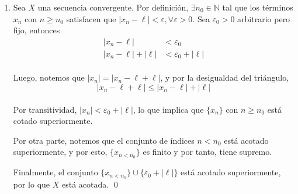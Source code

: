 \documentclass[11pt]{article}
\newcommand{\N}{\mathbb{N}}
\let\epsilon\varepsilon
\begin{document}
\begin{enumerate}[label=\alph*),font=\bfseries]
    \item Sea $X$ una secuencia convergente. Por definición, $\exists n_0 \in \N$ tal que los términos $x_n$ con $n\geq n_0$ satisfacen que $|x_n-\ell|<\epsilon, \forall \epsilon>0$. Sea $\epsilon_0>0$ arbitrario pero fijo, entonces \begin{align*}
        |x_n - \ell| &< \epsilon_0 \\
        |x_n - \ell| + |\ell| &< \epsilon_0 + |\ell|
    \end{align*}\\
    Luego, notemos que $|x_n| = |x_n-\ell+\ell|$, y por la desigualdad del triángulo, \[|x_n-\ell+\ell| \leq |x_n-\ell| + |\ell|\]\\ Por transitividad, $|x_n|< \epsilon_0 + |\ell|$, lo que implica que $\{x_n\}$ con $n\geq n_0$ está cotado superiormente.
    
    Por otra parte, notemos que el conjunto de índices $n<n_0$ está acotado superiormente, y por esto, $\{x_{n<n_0}\}$ es finito y por tanto, tiene supremo. %
    
    Finalmente, el conjunto $\{x_{n<n_0}\} \cup \{\epsilon_0 + |\ell|\}$ está acotado superiormente, por lo que $X$ está acotada. \qed
\end{enumerate}
\end{document}
